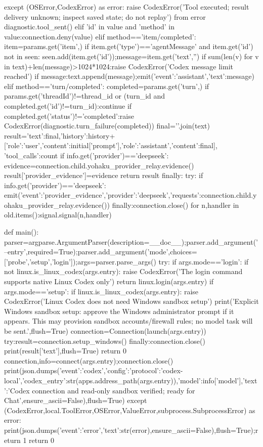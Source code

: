                 except (OSError,CodexError) as error:
                    raise CodexError('Tool executed; result delivery unknown; inspect saved state; do not replay') from error
                diagnostic.tool_sent()
            elif 'id' in value and 'method' in value:connection.deny(value)
            elif method=='item/completed':
                item=params.get('item',{})
                if item.get('type')=='agentMessage' and item.get('id') not in seen:
                    seen.add(item.get('id'));message=item.get('text','')
                    if sum(len(v) for v in text)+len(message)>1024*1024:raise CodexError('Codex message limit reached')
                    if message:text.append(message);emit({'event':'assistant','text':message})
            elif method=='turn/completed':
                completed=params.get('turn',{})
                if params.get('threadId')!=thread_id or (turn_id and completed.get('id')!=turn_id):continue
                if completed.get('status')!='completed':raise CodexError(diagnostic.turn_failure(completed))
                final='\n'.join(text)
                result={'text':final,'history':history+[{'role':'user','content':initial['prompt']},{'role':'assistant','content':final}], 'tool_calls':count}
                if info.get('provider')=='deepseek':
                    evidence=connection.child.yohaku_provider_relay.evidence()
                    result['provider_evidence']=evidence
                return result
    finally:
        try:
            if info.get('provider')=='deepseek':
                emit({'event':'provider_evidence','provider':'deepseek','requests':connection.child.yohaku_provider_relay.evidence()})
        finally:connection.close()
        for n,handler in old.items():signal.signal(n,handler)

def main():
    parser=argparse.ArgumentParser(description=__doc__);parser.add_argument('--entry',required=True);parser.add_argument('mode',choices=['probe','setup','login']);args=parser.parse_args()
    try:
        if args.mode=='login':
            if not linux.is_linux_codex(args.entry):
                raise CodexError('The login command supports native Linux Codex only')
            return linux.login(args.entry)
        if args.mode=='setup':
            if linux.is_linux_codex(args.entry):
                raise CodexError('Linux Codex does not need Windows sandbox setup')
            print('Explicit Windows sandbox setup: approve the Windows administrator prompt if it appears. This may provision sandbox accounts/firewall rules; no model task will be sent.',flush=True)
            connection=Connection(launch(args.entry))
            try:result=connection.setup_windows()
            finally:connection.close()
            print(result['text'],flush=True)
            return 0
        connection,info=connect(args.entry);connection.close()
        print(json.dumps({'event':'codex','config':{'protocol':'codex-local','codex_entry':str(apps.address_path(args.entry)),'model':info['model']},'text':'Codex connection and read-only sandbox verified; ready for Chat'},ensure_ascii=False),flush=True)
    except (CodexError,local.ToolError,OSError,ValueError,subprocess.SubprocessError) as error:
        print(json.dumps({'event':'error','text':str(error)},ensure_ascii=False),flush=True);return 1
    return 0

